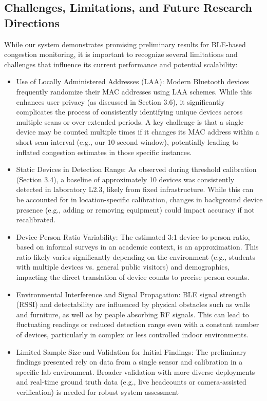 \documentclass[runningheads]{llncs}
\begin{document}
\subsection{Challenges, Limitations, and Future Research Directions}
While our system demonstrates promising preliminary results for BLE-based congestion monitoring, it is important to recognize several limitations and challenges that influence its current performance and potential scalability:
\begin{itemize}
    \item     Use of Locally Administered Addresses (LAA): Modern Bluetooth devices frequently randomize their MAC addresses using LAA schemes. While this enhances user privacy (as discussed in Section 3.6), it significantly complicates the process of consistently identifying unique devices across multiple scans or over extended periods. A key challenge is that a single device may be counted multiple times if it changes its MAC address within a short scan interval (e.g., our 10-second window), potentially leading to inflated congestion estimates in those specific instances.
    \item     Static Devices in Detection Range: As observed during threshold calibration (Section 3.4), a baseline of approximately 10 devices was consistently detected in laboratory L2.3, likely from fixed infrastructure. While this can be accounted for in location-specific calibration, changes in background device presence (e.g., adding or removing equipment) could impact accuracy if not recalibrated.
    \item     Device-Person Ratio Variability: The estimated 3:1 device-to-person ratio, based on informal surveys in an academic context, is an approximation. This ratio likely varies significantly depending on the environment (e.g., students with multiple devices vs. general public visitors) and demographics, impacting the direct translation of device counts to precise person counts.
    \item     Environmental Interference and Signal Propagation: BLE signal strength (RSSI) and detectability are influenced by physical obstacles such as walls and furniture, as well as by peaple absorbing RF signals. This can lead to fluctuating readings or reduced detection range even with a constant number of devices, particularly in complex or less controlled indoor environments.
    \item     Limited Sample Size and Validation for Initial Findings: The preliminary findings presented rely on data from a single sensor and calibration in a specific lab environment. Broader validation with more diverse deployments and real-time ground truth data (e.g., live headcounts or camera-assisted verification) is needed for robust system assessment
\end{itemize}
\end{document}
